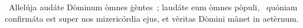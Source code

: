 {~Allelúja}
{%
audáte Dòminum òmnes ġèntes~; laudáte eum òmnes pòpuli,
~quóniam confirmáta est super nos mizericórdia ejus, et vèritas Dòmini mànet in aetèrnum.}
